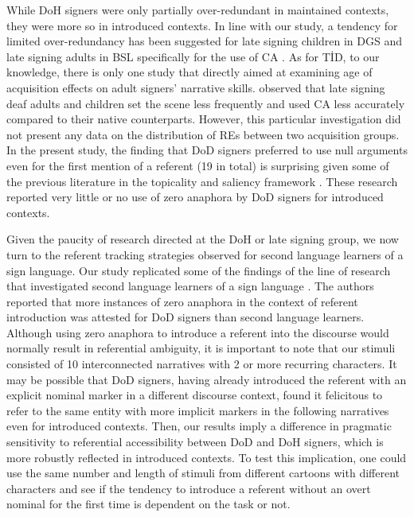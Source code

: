 \documentclass[review]{elsarticle} %
\begin{document}
While DoH signers were only partially over-redundant in maintained
contexts, they were more so in introduced contexts. In line with our
study, a tendency for limited over-redundancy has been suggested for
late signing children in DGS \citep{becker2009} and late signing adults
in BSL specifically for the use of CA \citep{cormier2013}. As for TİD,
to our knowledge, there is only one study \citep{gur2018} that directly
aimed at examining age of acquisition effects on adult signers'
narrative skills. \citet{gur2018} observed that late signing deaf adults
and children set the scene less frequently and used CA less accurately
compared to their native counterparts. However, this particular
investigation did not present any data on the distribution of REs
between two acquisition groups. In the present study, the finding that
DoD signers preferred to use null arguments even for the first mention
of a referent (19 in total) is surprising given some of the previous
literature in the topicality and saliency framework
\citep{cormier2013, swabey2002, ferrara2022}. These research reported
very little or no use of zero anaphora by DoD signers for introduced
contexts.

Given the paucity of research directed at the DoH or late signing group,
we now turn to the referent tracking strategies observed for second
language learners of a sign language. Our study replicated some of the
findings of the line of research that investigated second language
learners of a sign language \citep{bel2015, frederiksen2019}. The
authors reported that more instances of zero anaphora in the context of
referent introduction was attested for DoD signers than second language
learners. Although using zero anaphora to introduce a referent into the
discourse would normally result in referential ambiguity, it is
important to note that our stimuli consisted of 10 interconnected
narratives with 2 or more recurring characters. It may be possible that
DoD signers, having already introduced the referent with an explicit
nominal marker in a different discourse context, found it felicitous to
refer to the same entity with more implicit markers in the following
narratives even for introduced contexts. Then, our results imply a
difference in pragmatic sensitivity to referential accessibility between
DoD and DoH signers, which is more robustly reflected in introduced
contexts. To test this implication, one could use the same number and
length of stimuli from different cartoons with different characters and
see if the tendency to introduce a referent without an overt nominal for
the first time is dependent on the task or not.
\end{document}
